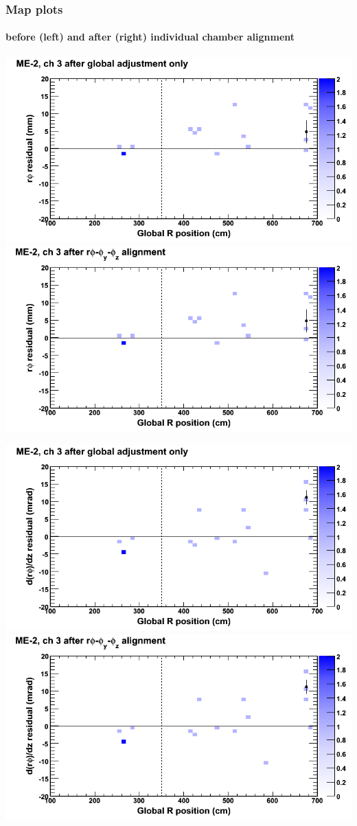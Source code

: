 \documentclass[compress]{beamer}
\begin{document}
\begin{frame}
\frametitle{Map plots}
\framesubtitle{before (left) and after (right) individual chamber alignment}
\includegraphics[width=0.5\linewidth]{ringmapplots_3dof/before_CSCvsr_mem2ch03_x.png} \includegraphics[width=0.5\linewidth]{ringmapplots_3dof/after_CSCvsr_mem2ch03_x.png}

\includegraphics[width=0.5\linewidth]{ringmapplots_3dof/before_CSCvsr_mem2ch03_dxdz.png} \includegraphics[width=0.5\linewidth]{ringmapplots_3dof/after_CSCvsr_mem2ch03_dxdz.png}
\end{frame}
\end{document}
